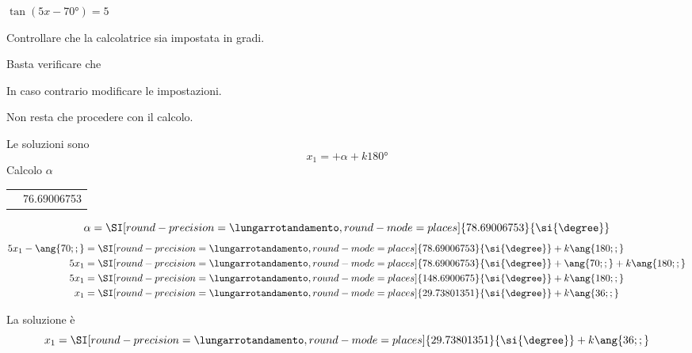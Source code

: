  	$\tan (5x-\ang{70;;})=5$

 	Controllare che la calcolatrice sia impostata in gradi.

 	Basta verificare che
 	\testgradi

 	In caso contrario modificare le impostazioni.

 	Non resta che procedere con il calcolo.

 	Le soluzioni sono
 	\[x_1=+\alpha+k\ang{180;;}\]
 	Calcolo $\alpha$
 	\begin{center}
 		\begin{tabular}{ll}
 			\tastoitan\tasto{\num[round-precision=1,round-mode=places]{5}}
 			\tastouguale&\num[round-precision=\lungarrotandamento,round-mode=places]{76.69006753}
 		\end{tabular}
 	\end{center}
 	\[\alpha=\SI[round-precision=\lungarrotandamento,round-mode=places]{78.69006753}{\si{\degree}}\]
 	\begin{align*}
 	5x_1-\ang{70;;}&=\SI[round-precision=\lungarrotandamento,round-mode=places]{78.69006753}{\si{\degree}}+k\ang{180;;}\\
 	5x_1&=\SI[round-precision=\lungarrotandamento,round-mode=places]{78.69006753}{\si{\degree}}+\ang{70;;}+k\ang{180;;}\\
 	5x_1&=\SI[round-precision=\lungarrotandamento,round-mode=places]{148.6900675}{\si{\degree}}+k\ang{180;;}\\
 	x_1&=\SI[round-precision=\lungarrotandamento,round-mode=places]{29.73801351}{\si{\degree}}+k\ang{36;;}
 	\end{align*}

 	La soluzione è
 \[x_1=\SI[round-precision=\lungarrotandamento,round-mode=places]{29.73801351}{\si{\degree}}+k\ang{36;;}\]
 

